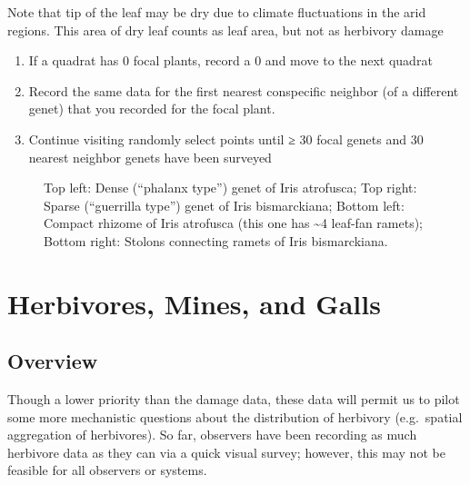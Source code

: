 \documentclass[
  letterpaper,
  oneside,
  open=any]{scrbook}
\begin{document}
Note that tip of the leaf may be dry due to climate fluctuations in the
arid regions. This area of dry leaf counts as leaf area, but not as
herbivory damage

\begin{enumerate}
\def\labelenumi{\arabic{enumi}.}
\setcounter{enumi}{1}
\item
  If a quadrat has 0 focal plants, record a 0 and move to the next
  quadrat
\item
  Record the same data for the first nearest conspecific neighbor (of a
  different genet) that you recorded for the focal plant.
\item
  Continue visiting randomly select points until ≥ 30 focal genets and
  30 nearest neighbor genets have been surveyed
\end{enumerate}

\begin{figure}


\caption{\label{fig-rhizo}Top left: Dense (``phalanx type'') genet of
Iris atrofusca; Top right: Sparse (``guerrilla type'') genet of Iris
bismarckiana; Bottom left: Compact rhizome of Iris atrofusca (this one
has \textasciitilde4 leaf-fan ramets); Bottom right: Stolons connecting
ramets of Iris bismarckiana.}

\end{figure}%

\chapter{Herbivores, Mines, and Galls}\label{sec-herbivore}

\section{Overview}\label{overview-4}

Though a lower priority than the damage data, these data will permit us
to pilot some more mechanistic questions about the distribution of
herbivory (e.g.~spatial aggregation of herbivores). So far, observers
have been recording as much herbivore data as they can via a quick
visual survey; however, this may not be feasible for all observers or
systems.
\end{document}
